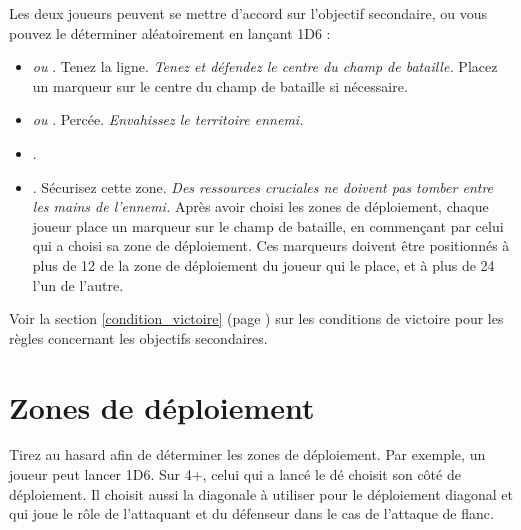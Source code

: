 Les deux joueurs peuvent se mettre d'accord sur l'objectif secondaire, ou vous pouvez le déterminer aléatoirement en lançant 1D6 : 
\begin{itemize}[label={-}]
\item \emph{ ou }. Tenez la ligne. \emph{Tenez et défendez le centre du champ de bataille.} Placez un marqueur sur le centre du champ de bataille si nécessaire.
\item \emph{ ou }. Percée. \emph{Envahissez le territoire ennemi.}
\item \emph{}. 
\item \emph{}. Sécurisez cette zone. \emph{Des ressources cruciales ne doivent pas tomber entre les mains de l'ennemi.} Après avoir choisi les zones de déploiement, chaque joueur place un marqueur sur le champ de bataille, en commençant par celui qui a choisi sa zone de déploiement. Ces marqueurs doivent être positionnés à plus de 12{\pouce} de la zone de déploiement du joueur qui le place, et à plus de 24{\pouce} l’un de l’autre.
\end{itemize}

Voir la section \ref{condition_victoire} (page \pageref{condition_victoire}) sur les conditions de victoire pour les règles concernant les objectifs secondaires.

\section{Zones de déploiement}

Tirez au hasard afin de déterminer les zones de déploiement. Par exemple, un joueur peut lancer 1D6. Sur 4+, celui qui a lancé le dé choisit son côté de déploiement. Il choisit aussi la diagonale à utiliser pour le déploiement diagonal et qui joue le rôle de l'attaquant et du défenseur dans le cas de l'attaque de flanc.


